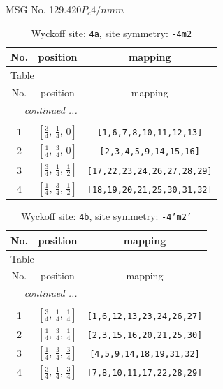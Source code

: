 \documentclass[fleqn,8pt]{jsarticle}
\begin{document}
\setcounter{MaxMatrixCols}{32}

\renewcommand{\tablename}{Table~}
\renewcommand{\figurename}{Figure~}
\begin{center}
\LARGE
MSG No. 129.420\quad$P_{c}4/nmm$
\end{center}
\renewcommand{\arraystretch}{1.2}
\begin{longtable}{ccc}
\caption{Wyckoff site: {\tt 4a}, site symmetry: {\tt -4m2}}
 \\
 \hline \hline
No. & position & mapping \\ \hline \endfirsthead

\multicolumn{2}{l}{\tablename\ \thetable{}} \\
 \hline \hline
No. & position & mapping \\ \hline \endhead

 \hline \hline
\multicolumn{2}{r}{\footnotesize\it continued ...} \\ \endfoot

 \hline \hline
\multicolumn{2}{r}{} \\ \endlastfoot

1 & $\left[ \frac{3}{4},\, \frac{1}{4},\, 0 \right]$ & {\tt [1,6,7,8,10,11,12,13]} \\ \hline
2 & $\left[ \frac{1}{4},\, \frac{3}{4},\, 0 \right]$ & {\tt [2,3,4,5,9,14,15,16]} \\ \hline
3 & $\left[ \frac{3}{4},\, \frac{1}{4},\, \frac{1}{2} \right]$ & {\tt [17,22,23,24,26,27,28,29]} \\ \hline
4 & $\left[ \frac{1}{4},\, \frac{3}{4},\, \frac{1}{2} \right]$ & {\tt [18,19,20,21,25,30,31,32]} \\
\end{longtable}
\renewcommand{\arraystretch}{1.2}
\begin{longtable}{ccc}
\caption{Wyckoff site: {\tt 4b}, site symmetry: {\tt -4'm2'}}
 \\
 \hline \hline
No. & position & mapping \\ \hline \endfirsthead

\multicolumn{2}{l}{\tablename\ \thetable{}} \\
 \hline \hline
No. & position & mapping \\ \hline \endhead

 \hline \hline
\multicolumn{2}{r}{\footnotesize\it continued ...} \\ \endfoot

 \hline \hline
\multicolumn{2}{r}{} \\ \endlastfoot

1 & $\left[ \frac{3}{4},\, \frac{1}{4},\, \frac{1}{4} \right]$ & {\tt [1,6,12,13,23,24,26,27]} \\ \hline
2 & $\left[ \frac{1}{4},\, \frac{3}{4},\, \frac{1}{4} \right]$ & {\tt [2,3,15,16,20,21,25,30]} \\ \hline
3 & $\left[ \frac{1}{4},\, \frac{3}{4},\, \frac{3}{4} \right]$ & {\tt [4,5,9,14,18,19,31,32]} \\ \hline
4 & $\left[ \frac{3}{4},\, \frac{1}{4},\, \frac{3}{4} \right]$ & {\tt [7,8,10,11,17,22,28,29]} \\
\end{longtable}
\end{document}
